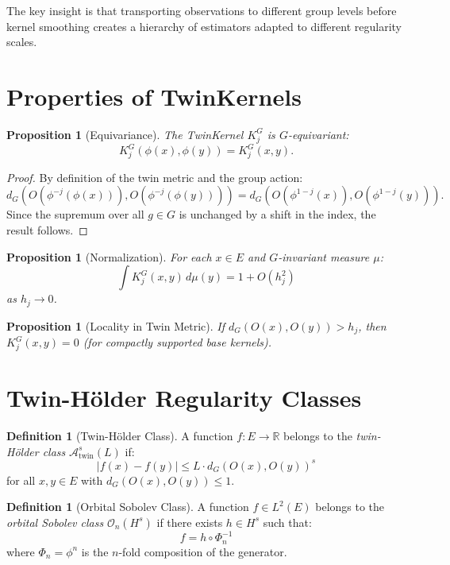 \documentclass[11pt,twoside,openright]{book}
\theoremstyle{plain}
\newtheorem{proposition}[theorem]{Proposition}
\theoremstyle{definition}
\newtheorem{definition}[theorem]{Definition}
\theoremstyle{remark}
\newcommand{\calO}{\mathcal{O}}
\newcommand{\calA}{\mathcal{A}}
\newcommand{\Rd}{\mathbb{R}}
\begin{document}
The key insight is that transporting observations to different group levels before kernel smoothing creates a hierarchy of estimators adapted to different regularity scales.

\section{Properties of TwinKernels}

\begin{proposition}[Equivariance]
\label{prop:equivariance}
The TwinKernel $K_j^G$ is $G$-equivariant:
\[
K_j^G(\phi(x), \phi(y)) = K_j^G(x, y).
\]
\end{proposition}

\begin{proof}
By definition of the twin metric and the group action:
\[
d_G(O(\phi^{-j}(\phi(x))), O(\phi^{-j}(\phi(y)))) = d_G(O(\phi^{1-j}(x)), O(\phi^{1-j}(y))).
\]
Since the supremum over all $g \in G$ is unchanged by a shift in the index, the result follows.
\end{proof}

\begin{proposition}[Normalization]
For each $x \in E$ and $G$-invariant measure $\mu$:
\[
\int K_j^G(x, y) \, d\mu(y) = 1 + O(h_j^2)
\]
as $h_j \to 0$.
\end{proposition}

\begin{proposition}[Locality in Twin Metric]
If $d_G(O(x), O(y)) > h_j$, then $K_j^G(x, y) = 0$ (for compactly supported base kernels).
\end{proposition}

\section{Twin-Hölder Regularity Classes}

\begin{definition}[Twin-Hölder Class]
\label{def:twin-holder}
A function $f : E \to \Rd$ belongs to the \emph{twin-Hölder class} $\calA_{\text{twin}}^s(L)$ if:
\[
|f(x) - f(y)| \leq L \cdot d_G(O(x), O(y))^s
\]
for all $x, y \in E$ with $d_G(O(x), O(y)) \leq 1$.
\end{definition}

\begin{definition}[Orbital Sobolev Class]
A function $f \in L^2(E)$ belongs to the \emph{orbital Sobolev class} $\calO_n(H^s)$ if there exists $h \in H^s$ such that:
\[
f = h \circ \Phi_n^{-1}
\]
where $\Phi_n = \phi^n$ is the $n$-fold composition of the generator.
\end{definition}
\end{document}
